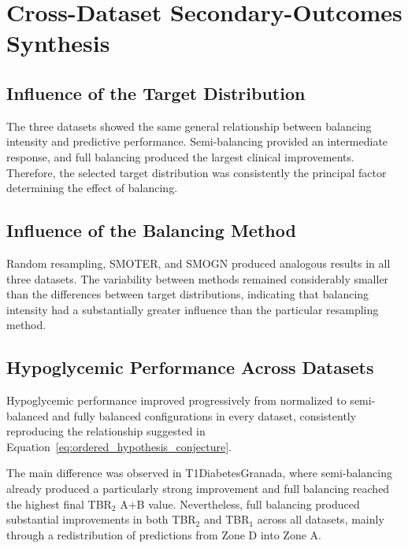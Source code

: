 \section{Cross-Dataset Secondary-Outcomes Synthesis}
\label{sec:cross_dataset_secondary_synthesis}

\subsection{Influence of the Target Distribution}
\label{subsec:cross_dataset_target_effect}

The three datasets showed the same general relationship between balancing intensity and predictive performance. Semi-balancing provided an intermediate response, and full balancing produced the largest clinical improvements. Therefore, the selected target distribution was consistently the principal factor determining the effect of balancing.

\subsection{Influence of the Balancing Method}
\label{subsec:cross_dataset_method_effect}

Random resampling, SMOTER, and SMOGN produced analogous results in all three datasets. The variability between methods remained considerably smaller than the differences between target distributions, indicating that balancing intensity had a substantially greater influence than the particular resampling method.

\subsection{Hypoglycemic Performance Across Datasets}
\label{subsec:cross_dataset_hypoglycemia}

Hypoglycemic performance improved progressively from normalized to semi-balanced and fully balanced configurations in every dataset, consistently reproducing the relationship suggested in Equation~\ref{eq:ordered_hypothesis_conjecture}.

The main difference was observed in T1DiabetesGranada, where semi-balancing already produced a particularly strong improvement and full balancing reached the highest final TBR$_2$ A+B value. Nevertheless, full balancing produced substantial improvements in both TBR$_2$ and TBR$_1$ across all datasets, mainly through a redistribution of predictions from Zone D into Zone A.

